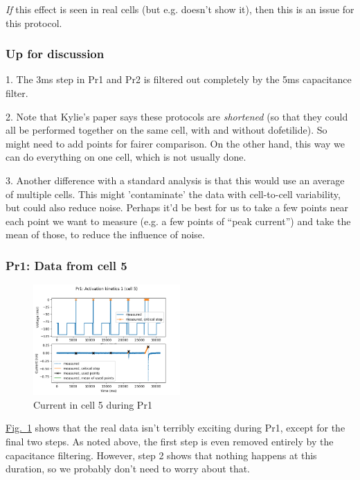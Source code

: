 \documentclass[preprint,authoryear,10pt]{elsarticle}
\newcommand\Fig[2][]{\hyperref[fig:#2]{Fig.~\ref*{fig:#2}\ifstrempty{#1}{}{.#1}}}
\begin{document}
\emph{If} this effect is seen in real cells (but e.g. \citet{Zhou1998IKrHERG}
 doesn't show it), then this is an issue for this protocol.

\subsubsection{Up for discussion}

1. The 3ms step in Pr1 and Pr2 is filtered out completely by the 5ms
capacitance filter.

2. Note that Kylie's paper says these protocols are \emph{shortened} (so that
 they could all be performed together on the same cell, with and without
 dofetilide).
So might need to add points for fairer comparison.
On the other hand, this way we can do everything on one cell, which is not
 usually done.

3. Another difference with a standard analysis is that this would use an
 average of multiple cells.
This might 'contaminate' the data with cell-to-cell variability, but could also
 reduce noise.
Perhaps it'd be best for us to take a few points near each point we want to
 measure (e.g. a few points of ``peak current'') and take the mean of those, to
 reduce the influence of noise.

%
%
\subsubsection{Pr1: Data from cell 5}

\begin{figure}[H]
\centerline{
\includegraphics[width=0.5\textwidth]{fig/pr1-cell-5}
}
\caption{%
Current in cell 5 during Pr1
}
\label{fig:analysis-pr1-cell-5}
\end{figure}

\Fig{analysis-pr1-cell-5} shows that the real data isn't terribly exciting
during Pr1, except for the final two steps.
As noted above, the first step is even removed entirely by the capacitance
 filtering.
However, step 2 shows that nothing happens at this duration, so we probably
 don't need to worry about that.
\end{document}
